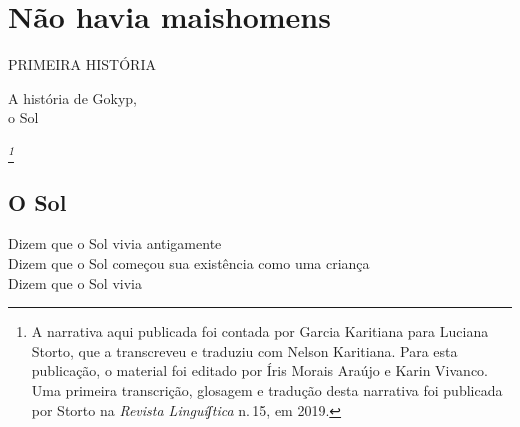 \part[Não havia mais homens]{Não havia mais\break homens}


\pagebreak
\thispagestyle{empty}
\mbox{}
\begin{center}
\vspace{4cm}
{\formularlight\small PRIMEIRA HISTÓRIA}

\medskip

{\formular\huge A história de Gokyp,\\\vspace{0.2cm} o Sol}
\end{center}
\pagebreak


\thispagestyle{empty}
\mbox{}
\vfill
\noindent{}\textit{\footnote{A narrativa aqui publicada foi contada por Garcia Karitiana para Luciana Storto, que a transcreveu e traduziu com Nelson Karitiana. Para esta publicação, o material foi editado por Íris Morais Araújo e Karin Vivanco. Uma primeira transcrição, glosagem e tradução desta narrativa foi publicada por Storto na \emph{Revista Linguíʃtica} n.\,15, em 2019.}}
\pagebreak


\chapter*{O Sol}

\begin{linenumbers}\begingroup\raggedright
\noindent Dizem que o Sol vivia antigamente\\
Dizem que o Sol começou sua existência como uma criança\\
Dizem que o Sol vivia
\end{linenumbers}\endgroup

